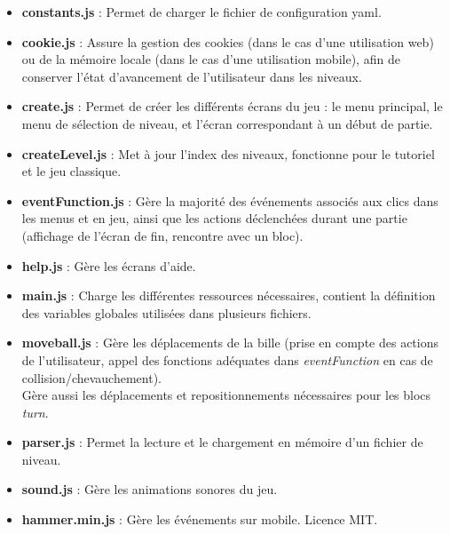 \documentclass[11pt]{article}
\begin{document}
\begin{itemize}
	\item
		\textbf{constants.js} : Permet de charger le fichier de 
		configuration yaml.\\
	\item
		\textbf{cookie.js} : Assure la gestion des cookies (dans le
		cas d'une utilisation web) ou de la mémoire locale (dans 
		le cas d'une utilisation mobile), afin de conserver l'état 
		d'avancement de l'utilisateur dans les niveaux.\\
	\item
		\textbf{create.js} : Permet de créer les différents écrans du
		jeu : le menu principal, le menu de sélection de niveau, et 
		l'écran correspondant à un début de partie.\\
	\item
		\textbf{createLevel.js} : Met à jour l'index des niveaux, 
		fonctionne pour le tutoriel et le jeu classique.\\
	\item
		\textbf{eventFunction.js} : Gère la majorité des événements 
		associés aux clics dans les menus et en jeu, ainsi que les 
		actions déclenchées durant une partie (affichage de l'écran de 
		fin, rencontre avec un bloc).\\
	\item
		\textbf{help.js} : Gère les écrans d'aide.\\
	\item
		\textbf{main.js} : Charge les différentes ressources 
		nécessaires, contient la définition des variables globales 
		utilisées dans plusieurs fichiers.\\
	\item
		\textbf{moveball.js} : Gère les déplacements de la bille 
		(prise en compte des actions de l'utilisateur, appel des 
		fonctions adéquates dans {\em eventFunction} en cas de 
		collision/chevauchement).\\
		Gère aussi les déplacements et repositionnements nécessaires 
		pour les blocs {\em turn}.\\
	\item
		\textbf{parser.js} : Permet la lecture et le chargement en 
		mémoire d'un fichier de niveau.\\
	\item
		\textbf{sound.js} : Gère les animations sonores du jeu.\\
	\item
		\textbf{hammer.min.js} : Gère les événements sur mobile. Licence
		MIT.\\

\end{itemize}
\end{document}

